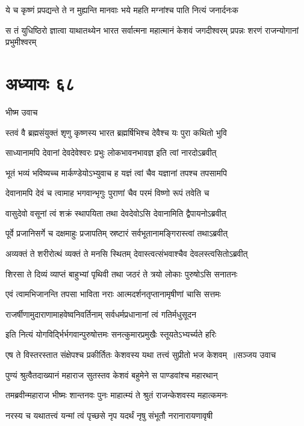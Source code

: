 \twolineshloka
{ये च कृष्णं प्रपद्यन्ते ते न मुह्यन्ति मानवाः}
{भये महति मग्नांश्च पाति नित्यं जनार्दनःक}


\threelineshloka
{स तं युधिष्ठिरो ज्ञात्वा याथातथ्येन भारत}
{सर्वात्मना महात्मानं केशवं जगदीश्वरम्}
{प्रपन्नः शरणं राजन्योगानां प्रभुमीश्वरम्}


\chapter{अध्यायः ६८}
\twolineshloka
{भीष्म उवाच}
{}


\twolineshloka
{स्तवं वै ब्रह्मसंयुक्तं शृणु कृष्णस्य भारत}
{ब्रह्मर्षिभिश्च देवैश्च यः पुरा कथितो भुवि}


\twolineshloka
{साध्यानामपि देवानां देवदेवेश्वरः प्रभुः}
{लोकभावनभावज्ञ इति त्वां नारदोऽब्रवीत्}


\twolineshloka
{भूतं भव्यं भविष्यच्च मार्कण्डेयोऽभ्युवाच ह}
{यज्ञं त्वां चैव यज्ञानां तपश्च तपसामपि}


\twolineshloka
{देवानामपि देवं च त्वामाह भगवान्भृगुः}
{पुराणां चैव परमं विष्णो रूपं तवेति च}


\twolineshloka
{वासुदेवो वसूनां त्वं शक्रं स्थापयिता तथा}
{देवदेवोऽसि देवानामिति द्वैपायनोऽब्रवीत्}


\twolineshloka
{पूर्वे प्रजानिसर्गे च दक्षमाहुः प्रजापतिम्}
{स्रष्टारं सर्वभूतानामङ्गिरास्त्वां तथाऽब्रवीत्}


\twolineshloka
{अव्यक्तं ते शरीरोत्थं व्यक्तं ते मनसि स्थितम्}
{देवास्त्वत्संभवाश्चैव देवलस्त्वसितोऽब्रवीत्}


\twolineshloka
{शिरसा ते दिव्यं व्याप्तं बाहुभ्यां पृथिवी तथा}
{जठरं ते त्रयो लोकाः पुरुषोऽसि सनातनः}


\twolineshloka
{एवं त्वामभिजानन्ति तपसा भाविता नराः}
{आत्मदर्शनतृप्तानामृषीणां चासि सत्तमः}


\twolineshloka
{राजर्षीणामुदाराणामाहवेष्वनिवर्तिनाम्}
{सर्वधर्मप्रधानानां त्वं गतिर्मधुसूदन}


\twolineshloka
{इति नित्यं योगविर्द्भिर्भगवान्पुरुषोत्तमः}
{सनत्कुमारप्रमुखैः स्तूयतेऽभ्यर्च्यते हरिः}


\threelineshloka
{एष ते विस्तरस्तात संक्षेपश्च प्रकीर्तितः}
{केशवस्य यथा तत्त्वं सुप्रीतो भज केशवम् ॥सञ्जय उवाच}
{}


\twolineshloka
{पुण्यं श्रुत्वैतदाख्यानं महाराज सुतस्तव}
{केशवं बहुमेने स पाण्डवांश्च महारथान्}


\twolineshloka
{तमब्रवीन्महाराज भीष्मः शान्तनवः पुनः}
{माहात्म्यं ते श्रुतं राजन्केशवस्य महात्कमनः}


\twolineshloka
{नरस्य च यथातत्त्वं यन्मां त्वं पृच्छसे नृप}
{यदर्थं नृषु संभूतौ नरानारायणावृषी}


